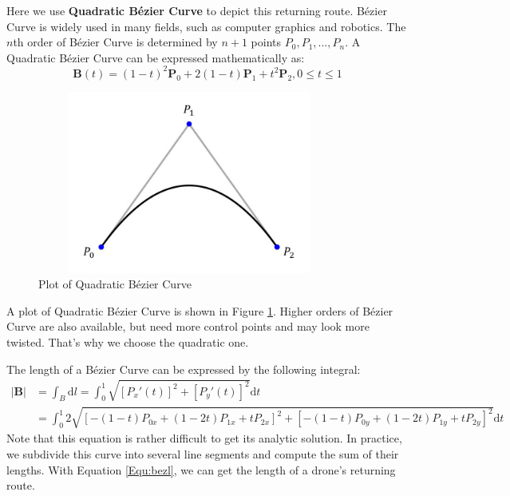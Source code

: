 \documentclass{mcmthesis}
\begin{document}
Here we use \textbf{Quadratic B\'{e}zier Curve} to depict this returning route. B\'{e}zier Curve is widely used in many fields, such as computer graphics and robotics. The $n$th order of B\'{e}zier Curve is determined by $n+1$ points $P_0, P_1, ..., P_{n}$. A Quadratic B\'{e}zier Curve can be expressed mathematically as:
\begin{equation}
    \mathbf{B}(t)=(1-t)^2\mathbf{P}_0 + 2(1-t)\mathbf{P}_1 + t^2\mathbf{P}_2, 0 \leq t \leq 1
    \label{Equ:bezr}
\end{equation}

\begin{figure}[htbp]
    \centering
    \includegraphics[width=10cm,height=6cm]{figures/bezier.jpg}
    \caption{Plot of Quadratic B\'{e}zier Curve}
    \label{Fig:bezr}
\end{figure}

A plot of Quadratic B\'{e}zier Curve is shown in Figure \ref{Fig:bezr}. Higher orders of B\'{e}zier Curve are also available, but need more control points and may look more twisted. That's why we choose the quadratic one. 

The length of a B\'{e}zier Curve can be expressed by the following integral:
\begin{equation}
\begin{aligned}
    |\mathbf{B}| &= \int_B \mathrm{d}l = \int_0^1 \sqrt{[P_x'(t)]^2 + [P_y'(t)]^2} \mathrm{d}t \\
    &= \int_0^1 2\sqrt{[-(1-t)P_{0x}+(1-2t)P_{1x}+tP_{2x}]^2 + [-(1-t)P_{0y}+(1-2t)P_{1y}+tP_{2y}]^2} \mathrm{d}t
\end{aligned}
\label{Equ:bezl}
\end{equation}
Note that this equation is rather difficult to get its analytic solution. In practice, we subdivide this curve into several line segments and compute the sum of their lengths. With Equation \ref{Equ:bezl}, we can get the length of a drone's returning route.
\end{document}
